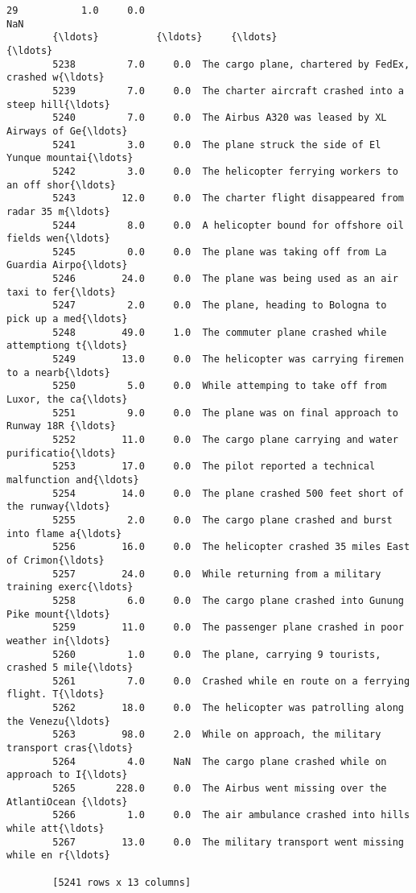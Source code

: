 \documentclass[11pt]{article}
\begin{document}
\begin{Verbatim}[commandchars=\\\{\}]
        29           1.0     0.0                                                NaN  
        {\ldots}          {\ldots}     {\ldots}                                                {\ldots}  
        5238         7.0     0.0  The cargo plane, chartered by FedEx, crashed w{\ldots}  
        5239         7.0     0.0  The charter aircraft crashed into a steep hill{\ldots}  
        5240         7.0     0.0  The Airbus A320 was leased by XL Airways of Ge{\ldots}  
        5241         3.0     0.0  The plane struck the side of El Yunque mountai{\ldots}  
        5242         3.0     0.0  The helicopter ferrying workers to an off shor{\ldots}  
        5243        12.0     0.0  The charter flight disappeared from radar 35 m{\ldots}  
        5244         8.0     0.0  A helicopter bound for offshore oil fields wen{\ldots}  
        5245         0.0     0.0  The plane was taking off from La Guardia Airpo{\ldots}  
        5246        24.0     0.0  The plane was being used as an air taxi to fer{\ldots}  
        5247         2.0     0.0  The plane, heading to Bologna to pick up a med{\ldots}  
        5248        49.0     1.0  The commuter plane crashed while attemptiong t{\ldots}  
        5249        13.0     0.0  The helicopter was carrying firemen to a nearb{\ldots}  
        5250         5.0     0.0  While attemping to take off from Luxor, the ca{\ldots}  
        5251         9.0     0.0  The plane was on final approach to Runway 18R {\ldots}  
        5252        11.0     0.0  The cargo plane carrying and water purificatio{\ldots}  
        5253        17.0     0.0  The pilot reported a technical malfunction and{\ldots}  
        5254        14.0     0.0  The plane crashed 500 feet short of the runway{\ldots}  
        5255         2.0     0.0  The cargo plane crashed and burst into flame a{\ldots}  
        5256        16.0     0.0  The helicopter crashed 35 miles East of Crimon{\ldots}  
        5257        24.0     0.0  While returning from a military training exerc{\ldots}  
        5258         6.0     0.0  The cargo plane crashed into Gunung Pike mount{\ldots}  
        5259        11.0     0.0  The passenger plane crashed in poor weather in{\ldots}  
        5260         1.0     0.0  The plane, carrying 9 tourists, crashed 5 mile{\ldots}  
        5261         7.0     0.0  Crashed while en route on a ferrying flight. T{\ldots}  
        5262        18.0     0.0  The helicopter was patrolling along the Venezu{\ldots}  
        5263        98.0     2.0  While on approach, the military transport cras{\ldots}  
        5264         4.0     NaN  The cargo plane crashed while on approach to I{\ldots}  
        5265       228.0     0.0  The Airbus went missing over the AtlantiOcean {\ldots}  
        5266         1.0     0.0  The air ambulance crashed into hills while att{\ldots}  
        5267        13.0     0.0  The military transport went missing while en r{\ldots}  
        
        [5241 rows x 13 columns]
\end{Verbatim}
            
\end{document}
